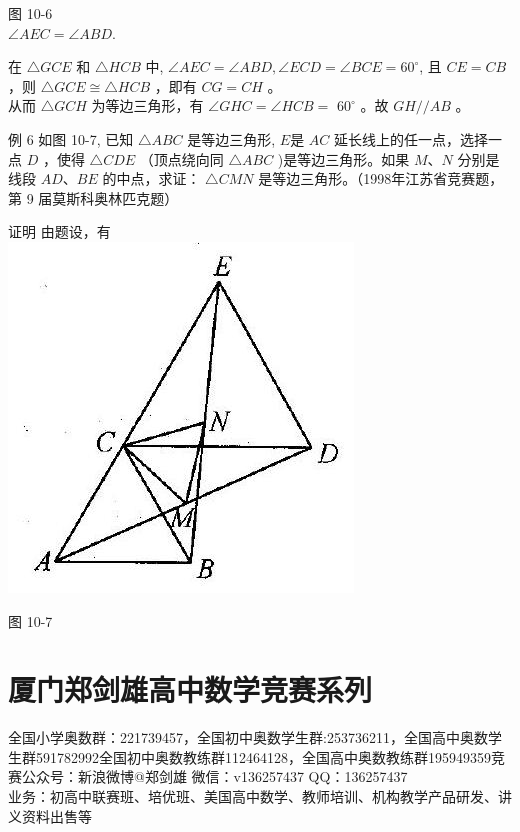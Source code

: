 \documentclass[10pt]{article}
\begin{document}
图 10-6\\
$\angle A E C=\angle A B D$.

在 $\triangle G C E$ 和 $\triangle H C B$ 中, $\angle A E C=\angle A B D, \angle E C D=\angle B C E=60^{\circ}$, 且 $C E=C B$ ，则 $\triangle G C E \cong \triangle H C B$ ，即有 $C G=C H$ 。\\
从而 $\triangle G C H$ 为等边三角形，有 $\angle G H C=\angle H C B=$ $60^{\circ}$ 。故 $G H / / A B$ 。

例 6 如图 10-7, 已知 $\triangle A B C$ 是等边三角形, $E$是 $A C$ 延长线上的任一点，选择一点 $D$ ，使得 $\triangle C D E$ （顶点绕向同 $\triangle A B C$ )是等边三角形。如果 $M 、 N$ 分别是线段 $A D 、 B E$ 的中点，求证： $\triangle C M N$ 是等边三角形。（1998年江苏省竞赛题，第 9 届莫斯科奥林匹克题）

证明 由题设，有\\
\includegraphics[max width=\textwidth, center]{2024_10_30_2c8f45efd4a519b08e1ag-097(2)}

图 10-7

\section*{厦门郑剑雄高中数学竞赛系列}
全国小学奥数群：221739457，全国初中奥数学生群:253736211，全国高中奥数学生群591782992全国初中奥数教练群112464128，全国高中奥数教练群195949359竞赛公众号：新浪微博@郑剑雄 微信：v136257437 QQ：136257437\\
业务：初高中联赛班、培优班、美国高中数学、教师培训、机构教学产品研发、讲义资料出售等
\end{document}

